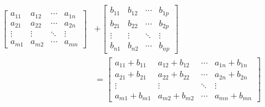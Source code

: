 \begin{align} \label{eq:matrix_sum}
  \begin{bmatrix}
    a_{11} & a_{12} & \cdots & a_{1n} \\
    a_{21} & a_{22} & \cdots & a_{2n} \\
    \vdots & \vdots & \ddots & \vdots \\
    a_{m1} & a_{m2} & \cdots & a_{mn}
  \end{bmatrix}
   & +
  \begin{bmatrix}
    b_{11} & b_{12} & \cdots & b_{1p} \\
    b_{21} & b_{22} & \cdots & b_{2p} \\
    \vdots & \vdots & \ddots & \vdots \\
    b_{n1} & b_{n2} & \cdots & b_{np}
  \end{bmatrix}
  \nonumber \\
   & =
  \begin{bmatrix}
    a_{11} + b_{11} & a_{12} + b_{12} & \cdots & a_{1n} + b_{1n} \\
    a_{21} + b_{21} & a_{22} + b_{22} & \cdots & a_{2n} + b_{2n} \\
    \vdots          & \vdots          & \ddots & \vdots          \\
    a_{m1} + b_{m1} & a_{m2} + b_{m2} & \cdots & a_{mn} + b_{mn}
  \end{bmatrix}
\end{align}

